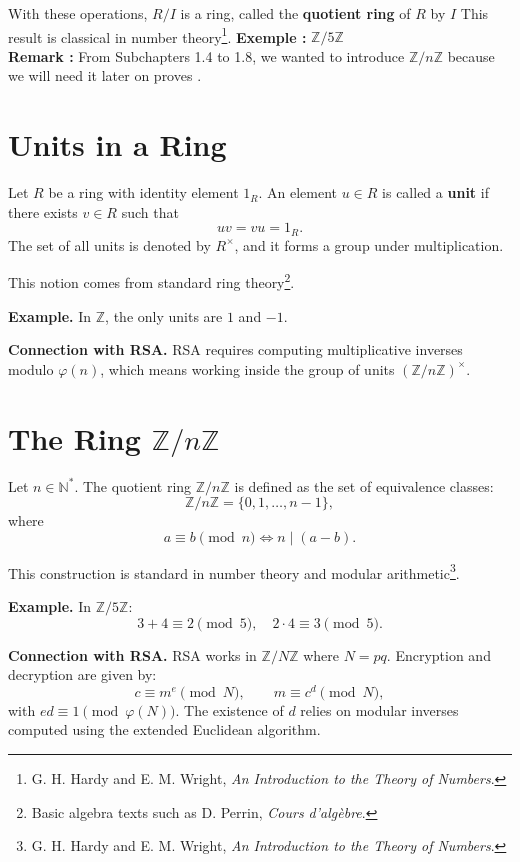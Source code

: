 With these operations, $R/I$ is a ring, called the \textbf{quotient ring} of $R$ by $I$
This result is classical in number theory\footnote{G. H. Hardy and E. M. Wright, \textit{An Introduction to the Theory of Numbers}.}.
\textbf{Exemple :}
$\mathbb{Z} / 5\mathbb{Z}$\\
\textbf{Remark :}
 From Subchapters 1.4 to 1.8, we wanted to introduce $\mathbb{Z} / n\mathbb{Z}$ because we will need it later on proves .
 \section{Units in a Ring}

Let $R$ be a ring with identity element $1_R$. An element $u \in R$ is called a \textbf{unit} if there exists $v \in R$ such that
\[
uv = vu = 1_R.
\]
The set of all units is denoted by $R^\times$, and it forms a group under multiplication.

This notion comes from standard ring theory\footnote{Basic algebra texts such as D. Perrin, \textit{Cours d’algèbre}.}.

\textbf{Example.} In $\mathbb{Z}$, the only units are $1$ and $-1$.

\textbf{Connection with RSA.} RSA requires computing multiplicative inverses modulo $\varphi(n)$, which means working inside the group of units $(\mathbb{Z}/n\mathbb{Z})^\times$.

\section{The Ring $\mathbb{Z}/n\mathbb{Z}$}

Let $n \in \mathbb{N}^*$. The quotient ring $\mathbb{Z}/n\mathbb{Z}$ is defined as the set of equivalence classes:
\[
\mathbb{Z}/n\mathbb{Z} = \{0,1,\dots,n-1\},
\]
where
\[
a \equiv b \pmod{n} \iff n \mid (a-b).
\]

This construction is standard in number theory and modular arithmetic\footnote{G. H. Hardy and E. M. Wright, \textit{An Introduction to the Theory of Numbers}.}.

\textbf{Example.} In $\mathbb{Z}/5\mathbb{Z}$:
\[
3+4 \equiv 2 \pmod{5}, \quad 2 \cdot 4 \equiv 3 \pmod{5}.
\]

\textbf{Connection with RSA.} RSA works in $\mathbb{Z}/N\mathbb{Z}$ where $N = pq$. Encryption and decryption are given by:
\[
c \equiv m^e \pmod{N}, \qquad m \equiv c^d \pmod{N},
\]
with $ed \equiv 1 \pmod{\varphi(N)}$. The existence of $d$ relies on modular inverses computed using the extended Euclidean algorithm.

